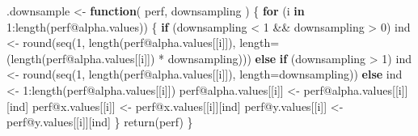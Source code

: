 \documentclass[
  letterpaper,
  DIV=11,
  numbers=noendperiod]{scrartcl}
\newenvironment{Shaded}{\begin{snugshade}}{\end{snugshade}}
\newcommand{\AttributeTok}[1]{\textcolor[rgb]{0.40,0.45,0.13}{#1}}
\newcommand{\ControlFlowTok}[1]{\textcolor[rgb]{0.00,0.23,0.31}{\textbf{#1}}}
\newcommand{\DecValTok}[1]{\textcolor[rgb]{0.68,0.00,0.00}{#1}}
\newcommand{\FunctionTok}[1]{\textcolor[rgb]{0.28,0.35,0.67}{#1}}
\newcommand{\NormalTok}[1]{\textcolor[rgb]{0.00,0.23,0.31}{#1}}
\newcommand{\OtherTok}[1]{\textcolor[rgb]{0.00,0.23,0.31}{#1}}
\newcommand{\SpecialCharTok}[1]{\textcolor[rgb]{0.37,0.37,0.37}{#1}}
\begin{document}
\begin{Shaded}
\begin{Highlighting}[]
\NormalTok{.downsample }\OtherTok{\textless{}{-}} \ControlFlowTok{function}\NormalTok{( perf, downsampling ) \{}
    \ControlFlowTok{for}\NormalTok{ (i }\ControlFlowTok{in} \DecValTok{1}\SpecialCharTok{:}\FunctionTok{length}\NormalTok{(perf}\SpecialCharTok{@}\NormalTok{alpha.values)) \{}
        \ControlFlowTok{if}\NormalTok{ (downsampling }\SpecialCharTok{\textless{}} \DecValTok{1} \SpecialCharTok{\&\&}\NormalTok{ downsampling }\SpecialCharTok{\textgreater{}} \DecValTok{0}\NormalTok{)}
\NormalTok{          ind }\OtherTok{\textless{}{-}} \FunctionTok{round}\NormalTok{(}\FunctionTok{seq}\NormalTok{(}\DecValTok{1}\NormalTok{, }\FunctionTok{length}\NormalTok{(perf}\SpecialCharTok{@}\NormalTok{alpha.values[[i]]),}
                           \AttributeTok{length=}\NormalTok{(}\FunctionTok{length}\NormalTok{(perf}\SpecialCharTok{@}\NormalTok{alpha.values[[i]]) }\SpecialCharTok{*}
\NormalTok{                                   downsampling)))}
        \ControlFlowTok{else} \ControlFlowTok{if}\NormalTok{ (downsampling }\SpecialCharTok{\textgreater{}} \DecValTok{1}\NormalTok{)}
\NormalTok{          ind }\OtherTok{\textless{}{-}} \FunctionTok{round}\NormalTok{(}\FunctionTok{seq}\NormalTok{(}\DecValTok{1}\NormalTok{, }\FunctionTok{length}\NormalTok{(perf}\SpecialCharTok{@}\NormalTok{alpha.values[[i]]),}
                           \AttributeTok{length=}\NormalTok{downsampling))}
        \ControlFlowTok{else}\NormalTok{ ind }\OtherTok{\textless{}{-}} \DecValTok{1}\SpecialCharTok{:}\FunctionTok{length}\NormalTok{(perf}\SpecialCharTok{@}\NormalTok{alpha.values[[i]])}
\NormalTok{        perf}\SpecialCharTok{@}\NormalTok{alpha.values[[i]] }\OtherTok{\textless{}{-}}\NormalTok{ perf}\SpecialCharTok{@}\NormalTok{alpha.values[[i]][ind]}
\NormalTok{        perf}\SpecialCharTok{@}\NormalTok{x.values[[i]] }\OtherTok{\textless{}{-}}\NormalTok{ perf}\SpecialCharTok{@}\NormalTok{x.values[[i]][ind]}
\NormalTok{        perf}\SpecialCharTok{@}\NormalTok{y.values[[i]] }\OtherTok{\textless{}{-}}\NormalTok{ perf}\SpecialCharTok{@}\NormalTok{y.values[[i]][ind]}
\NormalTok{    \}}
    \FunctionTok{return}\NormalTok{(perf)}
\NormalTok{\}}


\end{Highlighting}
\end{Shaded}
\end{document}
